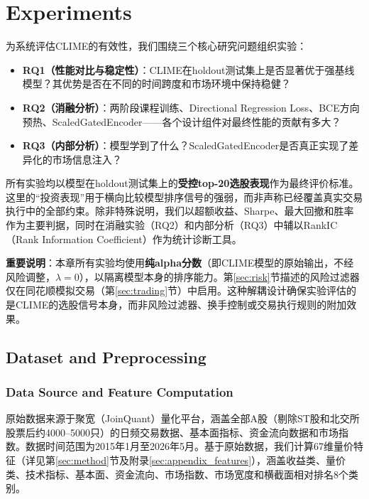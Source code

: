 \section{Experiments}
\label{sec:experiment}

为系统评估CLIME的有效性，我们围绕三个核心研究问题组织实验：
\begin{itemize}[leftmargin=*, itemsep=4pt]
    \item \textbf{RQ1（性能对比与稳定性）}：CLIME在holdout测试集上是否显著优于强基线模型？其优势是否在不同的时间跨度和市场环境中保持稳健？
    \item \textbf{RQ2（消融分析）}：两阶段课程训练、Directional Regression Loss、BCE方向预热、ScaledGatedEncoder——各个设计组件对最终性能的贡献有多大？
    \item \textbf{RQ3（内部分析）}：模型学到了什么？ScaledGatedEncoder是否真正实现了差异化的市场信息注入？
\end{itemize}

所有实验均以模型在holdout测试集上的\textbf{受控top-20选股表现}作为最终评价标准。这里的“投资表现”用于横向比较模型排序信号的强弱，而非声称已经覆盖真实交易执行中的全部约束。除非特殊说明，我们以超额收益、Sharpe、最大回撤和胜率作为主要判据，同时在消融实验（RQ2）和内部分析（RQ3）中辅以RankIC（Rank Information Coefficient）作为统计诊断工具。

\textbf{重要说明}：本章所有实验均使用\textbf{纯alpha分数}（即CLIME模型的原始输出，不经风险调整，$\lambda = 0$），以隔离模型本身的排序能力。第\ref{sec:risk}节描述的风险过滤器仅在同花顺模拟交易（第\ref{sec:trading}节）中启用。这种解耦设计确保实验评估的是CLIME的选股信号本身，而非风险过滤器、换手控制或交易执行规则的附加效果。

\subsection{Dataset and Preprocessing}
\label{sec:dataset}

\subsubsection{Data Source and Feature Computation}

原始数据来源于聚宽（JoinQuant）量化平台，涵盖全部A股（剔除ST股和北交所股票后约4000--5000只）的日频交易数据、基本面指标、资金流向数据和市场指数。数据时间范围为2015年1月至2026年5月。基于原始数据，我们计算67维量价特征（详见第\ref{sec:method}节及附录\ref{sec:appendix_features}），涵盖收益类、量价类、技术指标、基本面、资金流向、市场指数、市场宽度和横截面相对排名8个类别。

